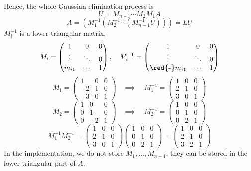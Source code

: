 Hence, the whole Gaussian elimination process is \[
    U = M_{n-1} \cdots M_2 M_1 A
\]
\[
    A = (M_1^{-1} (M_2^{-1} \cdots (M_{n-1}^{-1} U))) = LU
\]
$M_i^{-1}$ is a lower triangular matrix, \[
    M_i = \begin{pmatrix}
        1 & 0 & 0 \\
        \vdots & \ddots & 0 \\
        m_{i1} & \cdots & 1
    \end{pmatrix}, \quad M_i^{-1} = \begin{pmatrix}
        1 & 0 & 0 \\
        \vdots & \ddots & 0 \\
        \textbf{\red{-}}m_{i1} & \cdots & 1
    \end{pmatrix}
\]
\[
    M_1 = \begin{pmatrix}
        1 & 0 & 0 \\
        -2 & 1 & 0 \\
        -3 & 0 & 1
    \end{pmatrix} \quad \implies \quad M_1^{-1} = \begin{pmatrix}
        1 & 0 & 0 \\
        2 & 1 & 0 \\
        3 & 0 & 1
    \end{pmatrix}
\]
\[
    M_2 = \begin{pmatrix}
        1 & 0 & 0 \\
        0 & 1 & 0 \\
        0 & -2 & 1
    \end{pmatrix} \quad \implies \quad M_2^{-1} = \begin{pmatrix}
        1 & 0 & 0 \\
        0 & 1 & 0 \\
        0 & 2 & 1
    \end{pmatrix}
\]
\[
    M_1^{-1} M_2^{-1} = \begin{pmatrix}
        1 & 0 & 0 \\
        2 & 1 & 0 \\
        3 & 0 & 1
    \end{pmatrix} \begin{pmatrix}
        1 & 0 & 0 \\
        0 & 1 & 0 \\
        0 & 2 & 1
    \end{pmatrix} = \begin{pmatrix}
        1 & 0 & 0 \\
        2 & 1 & 0 \\
        3 & 2 & 1
    \end{pmatrix}
\]
In the implementation, we do not store $M_1, \ldots, M_{n-1}$, they can be stored in the lower triangular part of $A$.

